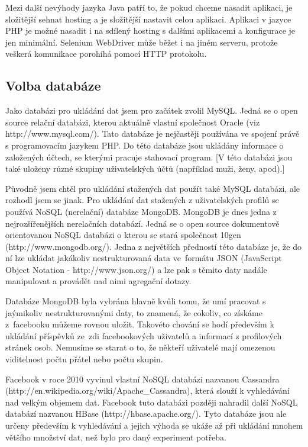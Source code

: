 \documentclass[thesis=M,czech]{FITthesis}[2013/05/10]
\begin{document}
Mezi další nevýhody jazyka Java patří to, že pokud chceme nasadit aplikaci, je složitější sehnat hosting a je složitější nastavit celou aplikaci. Aplikaci v jazyce PHP je možné nasadit i na sdílený hosting s dalšími aplikacemi a konfigurace je jen minimální. Selenium WebDriver může běžet i na jiném serveru, protože veškerá komunikace porohíhá pomocí HTTP protokolu.

\subsection{Volba databáze}

Jako databázi pro ukládání dat jsem pro začátek zvolil MySQL. Jedná se o open source relační databázi, kterou aktuálně vlastní společnost Oracle (viz http://www.mysql.com/). Tato databáze je nejčastěji používána ve spojení právě s programovacím jazykem PHP. Do této databáze jsou ukládány informace o založených účtech, se kterými pracuje stahovací program. [V této databázi jsou také uloženy různé skupiny uživatelských účtů (například muži, ženy, apod).] 

Původně jsem chtěl pro ukládání stažených dat použít také MySQL databázi, ale rozhodl jsem se jinak. Pro ukládání dat stažených z uživatelských profilů se používá NoSQL (nerelační) databáze MongoDB. MongoDB je dnes jedna z nejrozšířenějších nerelačních databází. Jedná se o open source dokumentově orientovanou NoSQL databázi o kterou se stará společnost 10gen (http://www.mongodb.org/). Jedna z největších předností této databáze je, že do ní lze ukládat jakákoliv nestrukturovaná data ve~formátu JSON (JavaScript Object Notation - http://www.json.org/) a lze pak s těmito daty nadále manipulovat a provádět nad nimi agregační dotazy. 

Databáze MongoDB byla vybrána hlavně kvůli tomu, že umí pracovat s jaýmikoliv nestrukturovanými daty, to znamená, že cokoliv, co získáme z~facebooku můžeme rovnou uložit. Takovéto chování se hodí především k ukládání příspěvků ze~zdi facebookových uživatelů a informací z profilových stránek osob. Nemusíme se starat o to, že někteří uživatelé mají omezenou viditelnost počtu přátel nebo počtu skupin.

Facebook v roce 2010 vyvinul vlastní NoSQL databázi nazvanou Cassandra (http://en.wikipedia.org/wiki/Apache\_Cassandra), která slouží k vyhledávání nad velkým objemem dat. Facebook tuto databázi později nahradil další NoSQL databází nazvanou HBase (http://hbase.apache.org/). Tyto databáze jsou ale určeny především k vyhledávání a jejich výhoda se ukáže až při ukládání mnohem většího množství dat, než bylo pro daný experiment potřeba.
\end{document}
